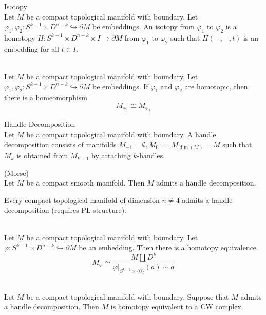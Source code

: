 \documentclass[a4paper]{article}
\begin{document}
\begin{defn}{Isotopy}{}\\
Let $M$ be a compact topological manifold with boundary. Let $\varphi_1,\varphi_2:S^{k-1}\times D^{n-k}\hookrightarrow\partial M$ be embeddings. An isotopy from $\varphi_1$ to $\varphi_2$ is a homotopy $H:S^{k-1}\times D^{n-k}\times I\to\partial M$ from $\varphi_1$ to $\varphi_2$ such that $H(-,-,t)$ is an embedding for all $t\in I$. 
\end{defn}

\begin{prp}{}{}\\
Let $M$ be a compact topological manifold with boundary. Let $\varphi_1,\varphi_2:S^{k-1}\times D^{n-k}\hookrightarrow\partial M$ be embeddings. If $\varphi_1$ and $\varphi_2$ are homotopic, then there is a homeomorphism $$M_{\varphi_1}\cong M_{\varphi_2}$$
\end{prp}

\begin{defn}{Handle Decomposition}{}\\
Let $M$ be a compact topological manifold with boundary. A handle decomposition consists of manifolds $M_{-1}=\emptyset,M_0,\dots,M_{\dim(M)}=M$ such that $M_k$ is obtained from $M_{k-1}$ by attaching $k$-handles. 
\end{defn}

\begin{thm}{(Morse)}{}\\
Let $M$ be a compact smooth manifold. Then $M$ admits a handle decomposition. 
\end{thm}

Every compact topological manifold of dimension $n\neq 4$ admits a handle decomposition (requires PL structure). 

\begin{prp}{}{}\\
Let $M$ be a compact topological manifold with boundary. Let $\varphi:S^{k-1}\times D^{n-k}\hookrightarrow\partial M$ be an embedding. Then there is a homotopy equivalence $$M_\varphi\simeq\frac{M\coprod D^k}{\varphi|_{S^{k-1}\times\{0\}}(a)\sim a}$$
\end{prp}

\begin{crl}{}{}\\
Let $M$ be a compact topological manifold with boundary. Suppose that $M$ admits a handle decomposition. Then $M$ is homotopy equivalent to a CW complex. 
\end{crl}
\end{document}
